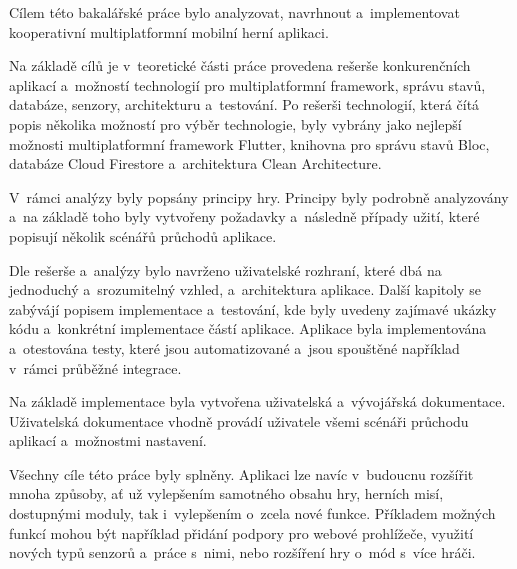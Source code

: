 \begin{conclusion}
Cílem této bakalářské práce bylo analyzovat, navrhnout a~implementovat
\mbox{kooperativní} multiplatformní mobilní herní aplikaci. 

Na základě cílů je v~teoretické části práce provedena rešerše
konkurenčních aplikací
a~možností technologií pro multiplatformní framework, správu stavů,
databáze, senzory, architekturu a~testování.
Po rešerši technologií,
která čítá popis několika možností pro výběr technologie,
byly vybrány jako nejlepší možnosti
multiplatformní framework Flutter,
knihovna pro správu stavů Bloc,
databáze Cloud Firestore
a~architektura Clean Architecture.

V~rámci analýzy byly popsány principy hry.
Principy byly podrobně analyzovány a~na základě toho byly vytvořeny
požadavky a~následně případy užití,
které popisují několik scénářů průchodů aplikace.

Dle rešerše a~analýzy bylo navrženo uživatelské rozhraní,
které dbá na jednoduchý a~srozumitelný vzhled,
a~architektura aplikace.
Další kapitoly se zabývájí popisem implementace a~testování,
kde byly uvedeny zajímavé ukázky kódu
a~konkrétní implementace částí aplikace.
Aplikace byla implementována a~otestována testy,
které jsou automatizované a~jsou spouštěné například v~rámci průběžné integrace.

Na základě implementace byla vytvořena uživatelská a~vývojářská dokumentace.
Uživatelská dokumentace vhodně provádí uživatele všemi scénáři průchodu
aplikací a~možnostmi nastavení.

Všechny cíle této práce byly splněny.
Aplikaci lze navíc v~budoucnu rozšířit mnoha způsoby,
ať už vylepšením samotného obsahu hry, herních misí, dostupnými moduly,
tak i~vylepšením o~zcela nové funkce.
Příkladem možných funkcí mohou být například
přidání podpory pro webové prohlížeče,
využití nových typů senzorů a~práce s~nimi,
nebo rozšíření hry o~mód s~více hráči.
\end{conclusion}

